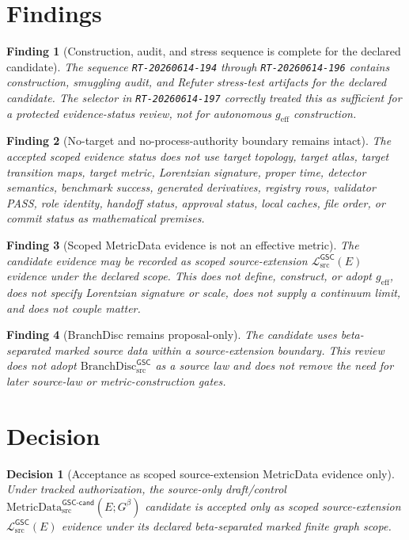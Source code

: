 \documentclass[11pt]{article}
\newcommand{\BranchDisc}{\mathrm{BranchDisc}_{\mathrm{src}}^{\mathsf{GSC}}}
\newcommand{\MetricDataCand}{\mathrm{MetricData}_{\mathrm{src}}^{\mathsf{GSC\mbox{-}cand}}}
\newcommand{\MetricData}{\mathcal{L}_{\mathrm{src}}^{\mathsf{GSC}}}
\newcommand{\Gbeta}{G^{\beta}}
\newcommand{\geff}{g_{\mathrm{eff}}}
\newtheorem{decision}{Decision}
\newtheorem{finding}{Finding}
\begin{document}
\section{Findings}

\begin{finding}[Construction, audit, and stress sequence is complete for the declared candidate]
The sequence \texttt{RT-20260614-194} through \texttt{RT-20260614-196}
contains construction, smuggling audit, and Refuter stress-test artifacts for
the declared candidate. The selector in \texttt{RT-20260614-197} correctly
treated this as sufficient for a protected evidence-status review, not for
autonomous \(\geff\) construction.
\end{finding}

\begin{finding}[No-target and no-process-authority boundary remains intact]
The accepted scoped evidence status does not use target topology, target atlas,
target transition maps, target metric, Lorentzian signature, proper time,
detector semantics, benchmark success, generated derivatives, registry rows,
validator PASS, role identity, handoff status, approval status, local caches,
file order, or commit status as mathematical premises.
\end{finding}

\begin{finding}[Scoped MetricData evidence is not an effective metric]
The candidate evidence may be recorded as scoped source-extension
\(\MetricData(E)\) evidence under the declared scope. This does not define,
construct, or adopt \(\geff\), does not specify Lorentzian signature or scale,
does not supply a continuum limit, and does not couple matter.
\end{finding}

\begin{finding}[BranchDisc remains proposal-only]
The candidate uses beta-separated marked source data within a source-extension
boundary. This review does not adopt \(\BranchDisc\) as a source law and does
not remove the need for later source-law or metric-construction gates.
\end{finding}

\section{Decision}

\begin{decision}[Acceptance as scoped source-extension MetricData evidence only]
Under tracked authorization, the source-only draft/control
\(\MetricDataCand(E;\Gbeta)\) candidate is accepted only as scoped
source-extension \(\MetricData(E)\) evidence under its declared beta-separated
marked finite graph scope.
\end{decision}
\end{document}
